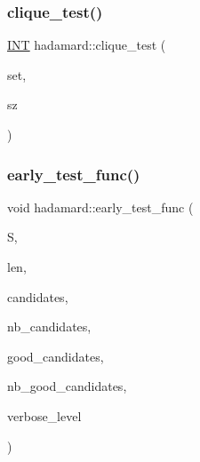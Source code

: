 \subsubsection{\texorpdfstring{clique\+\_\+test()}{clique\_test()}}
{\footnotesize\ttfamily \mbox{\hyperlink{galois_8h_a09fddde158a3a20bd2dcadb609de11dc}{I\+NT}} hadamard\+::clique\+\_\+test (\begin{DoxyParamCaption}\item[{\mbox{\hyperlink{galois_8h_a09fddde158a3a20bd2dcadb609de11dc}{I\+NT}} $\ast$}]{set,  }\item[{\mbox{\hyperlink{galois_8h_a09fddde158a3a20bd2dcadb609de11dc}{I\+NT}}}]{sz }\end{DoxyParamCaption})}

\mbox{\label{classhadamard_a299a7a683de28326c93c8fd5b9545144}} 
\subsubsection{\texorpdfstring{early\+\_\+test\+\_\+func()}{early\_test\_func()}}
{\footnotesize\ttfamily void hadamard\+::early\+\_\+test\+\_\+func (\begin{DoxyParamCaption}\item[{\mbox{\hyperlink{galois_8h_a09fddde158a3a20bd2dcadb609de11dc}{I\+NT}} $\ast$}]{S,  }\item[{\mbox{\hyperlink{galois_8h_a09fddde158a3a20bd2dcadb609de11dc}{I\+NT}}}]{len,  }\item[{\mbox{\hyperlink{galois_8h_a09fddde158a3a20bd2dcadb609de11dc}{I\+NT}} $\ast$}]{candidates,  }\item[{\mbox{\hyperlink{galois_8h_a09fddde158a3a20bd2dcadb609de11dc}{I\+NT}}}]{nb\+\_\+candidates,  }\item[{\mbox{\hyperlink{galois_8h_a09fddde158a3a20bd2dcadb609de11dc}{I\+NT}} $\ast$}]{good\+\_\+candidates,  }\item[{\mbox{\hyperlink{galois_8h_a09fddde158a3a20bd2dcadb609de11dc}{I\+NT}} \&}]{nb\+\_\+good\+\_\+candidates,  }\item[{\mbox{\hyperlink{galois_8h_a09fddde158a3a20bd2dcadb609de11dc}{I\+NT}}}]{verbose\+\_\+level }\end{DoxyParamCaption})}

\mbox{\label{classhadamard_a16af359850b8bdd0d2a73e260d496c33}} 
